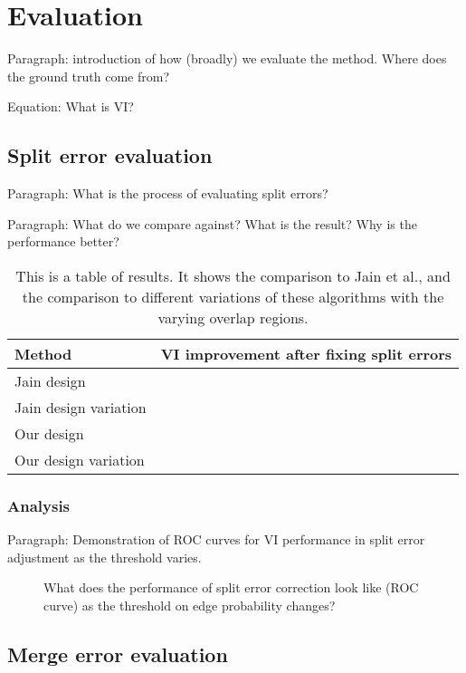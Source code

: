 \section{Evaluation}

Paragraph: introduction of how (broadly) we evaluate the method. Where does the ground truth come from?

Equation: What is VI?

\subsection{Split error evaluation}

Paragraph: What is the process of evaluating split errors?

Paragraph: What do we compare against? What is the result? Why is the performance better?

\begin{table}[t]
\begin{tabular}{ll}
\toprule
Method & VI improvement after fixing split errors \\
\midrule
Jain design & \\
Jain design variation & \\
Our design &  \\
Our design variation & \\
\bottomrule
\end{tabular}
\caption{This is a table of results. It shows the comparison to Jain et al., and the comparison to different variations of these algorithms with the varying overlap regions.}
\label{tab:spliterrorcorrectionperformance}
\end{table}

\subsubsection{Analysis}

Paragraph: Demonstration of ROC curves for VI performance in split error adjustment as the threshold varies.

\begin{figure}[t]
\missingfigure{}
\caption{What does the performance of split error correction look like (ROC curve) as the threshold on edge probability changes?}
\end{figure}

\subsection{Merge error evaluation}

